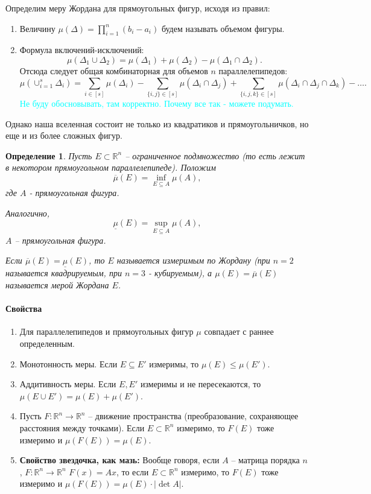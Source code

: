 \documentclass{article}
\theoremstyle{plain}
\newtheorem{definition}{Определение}
\theoremstyle{definition}
\theoremstyle{remark}
\renewcommand{\*}{\cdot}
\begin{document}
Определим меру Жордана для прямоугольных фигур, исходя из правил:
\begin{enumerate}
    \item Величину $\mu(\Delta) = \prod_{i = 1}^{n} (b_i - a_i)$ будем называть объемом фигуры.

    \item Формула включений-исключений: $$\mu(\Delta_1\cup \Delta_2) = \mu(\Delta_1) + \mu(\Delta_2) - \mu(\Delta_1\cap \Delta_2).$$ Отсюда следует общая комбинаторная для объемов $n$ параллелепипедов:
    $$\mu(\cup_{i=1}^s \Delta_i) = \sum_{i\in [s]}\mu(\Delta_i) - \sum_{\{i, j\}\in [s]}\mu(\Delta_i \cap \Delta_j) +  \sum_{\{i, j, k\}\in [s]}\mu(\Delta_i \cap \Delta_j \cap \Delta_k) - \ldots.$$ 
    \textcolor{cyan}{Не буду обосновывать, там корректно. Почему все так - можете подумать.}

\end{enumerate}

Однако наша вселенная состоит не только из квадратиков и прямоугольничков, но еще и из более сложных фигур.

\begin{definition}
Пусть $E \subset \mathbb{R}^n$ -- ограниченное подмножество (то есть лежит в некотором прямоугольном параллелепипеде).
Положим $$\overline{\mu}(E) = \inf_{E \subseteq A} \mu(A),$$ где $A$ - прямоугольная фигура.

Аналогично, $$\underline{\mu}(E) = \sup_{E \subseteq A} \mu(A),$$ 
$A$ -- прямоугольная фигура.

Если $\overline{\mu}(E) = \underline{\mu}(E)$, то $E$ называется измеримым по Жордану (при $n = 2$ называется квадрируемым, при $n = 3$ - кубируемым), а $\mu(E) = \overline{\mu}(E)$ называется мерой Жордана $E$.

\end{definition}
\paragraph{Свойства}
\begin{enumerate}
    \item Для параллелепипедов и прямоугольных фигур $\mu$ совпадает с раннее определенным.
    \item Монотонность меры.
    Если $E\subseteq E'$ измеримы, то $\mu(E) \leq \mu(E')$.
    \item Аддитивность меры.
    Если $E, E'$ измеримы и не пересекаются, то $\mu(E\cup E') = \mu(E) +\mu(E')$.
    
    \item Пусть $F : \mathbb{R}^n \rightarrow \mathbb{R}^n$ -- движение пространства (преобразование, сохраняющее расстояния между точками). Если $E\subset \mathbb{R}^n$ измеримо, то $F(E)$ тоже измеримо и $\mu(F(E)) = \mu(E)$.
    
 
    \item \textbf{Свойство звездочка, как мазь:}
    Вообще говоря, если $A$ -- матрица порядка $n$, $F: \mathbb{R}^n \rightarrow \mathbb{R}^n$  $F(x) = Ax$, то если $E \subset \mathbb{R}^n$ измеримо, то $F(E)$ тоже измеримо и $\mu(F(E)) = \mu(E)\cdot |\det A|$.

\end{enumerate}
\end{document}
